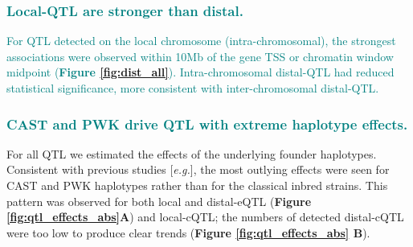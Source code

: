 \documentclass[9pt,twocolumn,twoside]{gsajnl}
\newcommand{\eg}{\emph{e.g.}\xspace}
\newcommand{\WV}[2]{\textcolor{red}{#1\footnote{\textcolor{red}{WV: #2}}}}
\newcommand{\GKinline}[1]{\textcolor{teal}{#1}}
\begin{document}
\subsubsection{\GKinline{Local-QTL are stronger than distal.}}
\GKinline{For QTL detected on the local chromosome (intra-chromosomal), the strongest associations were observed within 10Mb of the gene TSS or chromatin window midpoint (\textbf{Figure \ref{fig:dist_all}}). Intra-chromosomal distal-QTL had reduced statistical significance, more consistent with inter-chromosomal distal-QTL.} 


\subsubsection{\GKinline{CAST and PWK drive QTL with extreme haplotype effects.}}
For all QTL we estimated the effects of the underlying founder haplotypes. Consistent with previous studies [\eg \citet{Aylor2011}], the most outlying effects were seen for CAST and PWK haplotypes rather than for the classical inbred strains. This pattern was observed for both local and distal-eQTL (\textbf{Figure \ref{fig:qtl_effects_abs}A}) and local-cQTL; the numbers of detected distal-cQTL were too low to produce clear trends (\textbf{Figure \ref{fig:qtl_effects_abs} B}).

\end{document}

